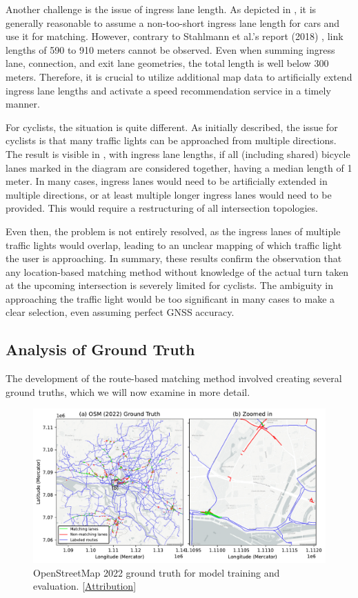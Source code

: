 Another challenge is the issue of ingress lane length. As depicted in , it is generally reasonable to assume a non-too-short ingress lane length for cars and use it for matching. However, contrary to Stahlmann et al.'s report (2018) \cite{stahlmann_exploring_2018}, link lengths of 590 to 910 meters cannot be observed. Even when summing ingress lane, connection, and exit lane geometries, the total length is well below 300 meters. Therefore, it is crucial to utilize additional map data to artificially extend ingress lane lengths and activate a speed recommendation service in a timely manner.

For cyclists, the situation is quite different. As initially described, the issue for cyclists is that many traffic lights can be approached from multiple directions. The result is visible in , with ingress lane lengths, if all (including shared) bicycle lanes marked in the diagram are considered together, having a median length of 1 meter. In many cases, ingress lanes would need to be artificially extended in multiple directions, or at least multiple longer ingress lanes would need to be provided. This would require a restructuring of all intersection topologies.

Even then, the problem is not entirely resolved, as the ingress lanes of multiple traffic lights would overlap, leading to an unclear mapping of which traffic light the user is approaching. In summary, these results confirm the observation that any location-based matching method without knowledge of the actual turn taken at the upcoming intersection is severely limited for cyclists. The ambiguity in approaching the traffic light would be too significant in many cases to make a clear selection, even assuming perfect GNSS accuracy.

\subsection{Analysis of Ground Truth}

The development of the route-based matching method involved creating several ground truths, which we will now examine in more detail.

\begin{figure}[htbp]
\centering 
\includegraphics[width=\linewidth]{images/matching-ground-truth-osm-old.pdf}
\caption{OpenStreetMap 2022 ground truth for model training and evaluation. [\hyperref[attribution]{Attribution}]}
\label{fig:matching-ground-truth-osm-old}
\end{figure}

